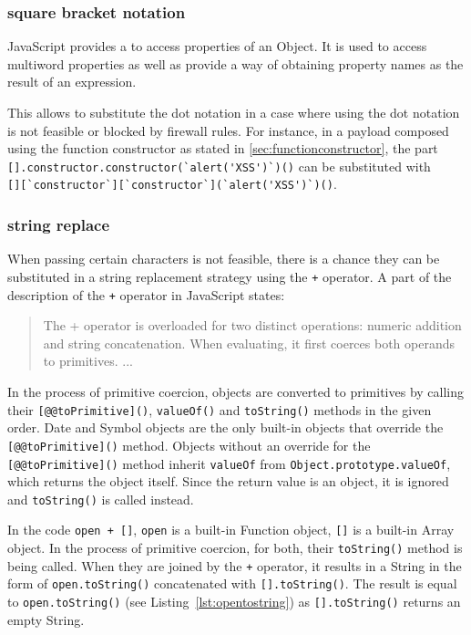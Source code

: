 \subsubsection{square bracket notation}
JavaScript provides a  to access properties of an Object. It is used to access multiword properties as well as provide a way of obtaining property names as the result of an expression. \cite{js/brackets}

This  allows to substitute the dot notation in a case where using the dot notation is not feasible or blocked by firewall rules.
For instance, in a payload composed using the function constructor as stated in \ref{sec:functionconstructor}, the part \\ \verb|[].constructor.constructor(`alert('XSS')`)()| can be substituted with \\ \verb|[][`constructor`][`constructor`](`alert('XSS')`)()|.


\subsubsection{string replace}
\label{sec:stringreplace}
When passing certain characters is not feasible, there is a chance they can be substituted in a string replacement strategy using the \verb|+| operator.
A part of the description of the \verb|+| operator in JavaScript states:
\begin{quote}
	The + operator is overloaded for two distinct operations: numeric addition and string concatenation. When evaluating, it first coerces both operands to primitives. ... \cite{js/+}
\end{quote}
In the process of primitive coercion, objects are converted to primitives by calling their \verb|[@@toPrimitive]()|, \verb|valueOf()| and \verb|toString()| methods in the given order. Date and Symbol objects are the only built-in objects that override the \verb|[@@toPrimitive]()| method.
Objects without an override for the \verb|[@@toPrimitive]()| method inherit \verb|valueOf| from \verb|Object.prototype.valueOf|, which returns the object itself.
Since the return value is an object, it is ignored and \verb|toString()| is called instead. \cite{js/primitiveCoercion}

In the code \verb|open + []|, \verb|open| is a built-in Function object, \verb|[]| is a built-in Array object.
In the process of primitive coercion, for both, their \verb|toString()| method is being called.
When they are joined by the \verb|+| operator, it results in a String in the form of \verb|open.toString()| concatenated with \verb|[].toString()|. The result is equal to \verb|open.toString()| (see Listing~\ref{lst:opentostring}) as \verb|[].toString()| returns an empty String.

